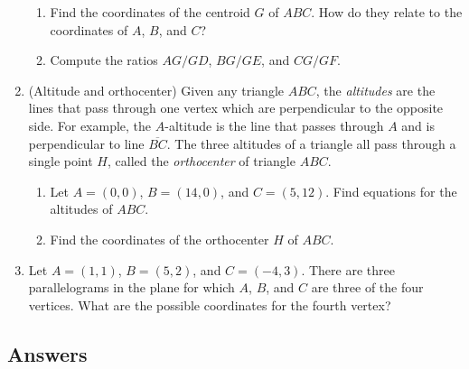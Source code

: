 \begin{enumerate}[resume]
\begin{enumerate}
\item Find the coordinates of the centroid $G$ of $ABC$. How do they relate to the coordinates of $A$, $B$, and $C$?
\item Compute the ratios $AG/GD$, $BG/GE$, and $CG/GF$.
\end{enumerate}
\item (Altitude and orthocenter) Given any triangle $ABC$, the \emph{altitudes} are the lines that pass through one vertex which are perpendicular to the opposite side. For example, the $A$-altitude is the line that passes through $A$ and is perpendicular to line $\overline{BC}$. The three altitudes of a triangle all pass through a single point $H$, called the \emph{orthocenter} of triangle $ABC$.
\begin{enumerate}
\item Let $A = (0,0)$, $B = (14,0)$, and $C = (5,12)$. Find equations for the altitudes of $ABC$.
\item Find the coordinates of the orthocenter $H$ of $ABC$.
\end{enumerate}
\item Let $A = (1,1)$, $B = (5,2)$, and $C = (-4,3)$. There are three parallelograms in the plane for which $A$, $B$, and $C$ are three of the four vertices. What are the possible coordinates for the fourth vertex?
\end{enumerate}

\newpage
\subsection{Answers}

